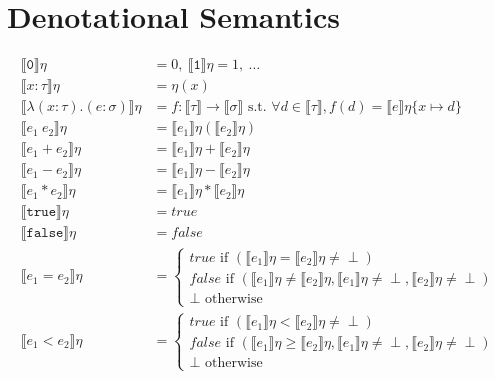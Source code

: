 \documentclass{westhesis}
\begin{document}
\section{Denotational Semantics}
\begin{align*}
 \llbracket \texttt{0} \rrbracket\eta &= 0, \  \llbracket \texttt{1} \rrbracket\eta = 1, \ \ldots \\
  \llbracket x : \tau \rrbracket\eta &= \eta(x) \\
  \llbracket \lambda (x : \tau) . (e : \sigma) \rrbracket\eta &= f : \llbracket \tau \rrbracket \rightarrow \llbracket \sigma \rrbracket
\text{ s.t. } \forall d \in \llbracket \tau \rrbracket, f(d) = \llbracket e \rrbracket\eta\{ x \mapsto d \} \\
 \llbracket e_1 \ e_2 \rrbracket \eta &= \llbracket e_1 \rrbracket\eta ( \llbracket e_2 \rrbracket\eta ) \\
 \llbracket e_1 + e_2 \rrbracket\eta &= \llbracket e_1 \rrbracket\eta + \llbracket e_2 \rrbracket\eta \\
 \llbracket e_1 - e_2 \rrbracket\eta &= \llbracket e_1 \rrbracket\eta - \llbracket e_2 \rrbracket\eta \\
 \llbracket e_1 * e_2 \rrbracket\eta &= \llbracket e_1 \rrbracket\eta * \llbracket e_2 \rrbracket\eta \\
  \llbracket \texttt{true} \rrbracket\eta &= true \\
   \llbracket \texttt{false} \rrbracket\eta &= false \\
 \llbracket e_1 = e_2 \rrbracket\eta &= 
 \begin{cases} 
      true \text{ if } (\llbracket e_1 \rrbracket\eta = \llbracket e_2 \rrbracket\eta \neq \perp) \\
      false \text{  if } (\llbracket e_1 \rrbracket\eta \neq \llbracket e_2\rrbracket\eta, \llbracket e_1 \rrbracket\eta \neq \perp, \llbracket e_2 \rrbracket\eta \neq \perp)\\
      \perp \text{ otherwise}
   \end{cases}
 \\
  \llbracket e_1 < e_2 \rrbracket\eta &= 
 \begin{cases} 
      true \text{ if } (\llbracket e_1 \rrbracket\eta < \llbracket e_2 \rrbracket\eta \neq \perp) \\
      false \text{  if } (\llbracket e_1 \rrbracket\eta \geq \llbracket e_2\rrbracket\eta, \llbracket e_1 \rrbracket\eta \neq \perp, \llbracket e_2 \rrbracket\eta \neq \perp)\\
      \perp \text{ otherwise}

\end{cases}
\end{align*}
\end{document}
